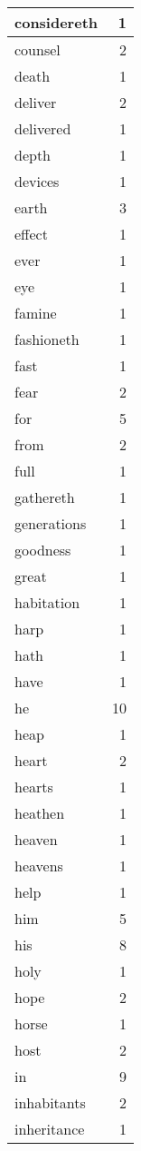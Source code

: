 \begin{center}
\begin{longtable}{l|r}
considereth & 1 \\ \hline
counsel & 2 \\ \hline
death & 1 \\ \hline
deliver & 2 \\ \hline
delivered & 1 \\ \hline
depth & 1 \\ \hline
devices & 1 \\ \hline
earth & 3 \\ \hline
effect & 1 \\ \hline
ever & 1 \\ \hline
eye & 1 \\ \hline
famine & 1 \\ \hline
fashioneth & 1 \\ \hline
fast & 1 \\ \hline
fear & 2 \\ \hline
for & 5 \\ \hline
from & 2 \\ \hline
full & 1 \\ \hline
gathereth & 1 \\ \hline
generations & 1 \\ \hline
goodness & 1 \\ \hline
great & 1 \\ \hline
habitation & 1 \\ \hline
harp & 1 \\ \hline
hath & 1 \\ \hline
have & 1 \\ \hline
he & 10 \\ \hline
heap & 1 \\ \hline
heart & 2 \\ \hline
hearts & 1 \\ \hline
heathen & 1 \\ \hline
heaven & 1 \\ \hline
heavens & 1 \\ \hline
help & 1 \\ \hline
him & 5 \\ \hline
his & 8 \\ \hline
holy & 1 \\ \hline
hope & 2 \\ \hline
horse & 1 \\ \hline
host & 2 \\ \hline
in & 9 \\ \hline
inhabitants & 2 \\ \hline
inheritance & 1 \\ \hline

\end{longtable}
\end{center}

